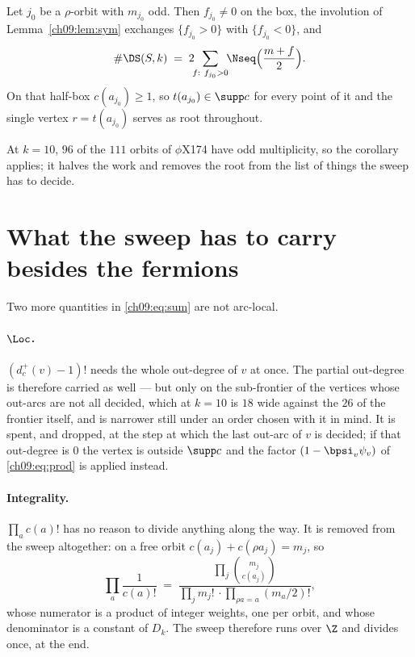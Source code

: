 \begin{corollary}\label{ch09:cor:half}
Let $j_0$ be a $\rho$-orbit with $m_{j_0}$ odd. Then $f_{j_0}\ne0$ on the box, the involution of
Lemma~\ref{ch09:lem:sym} exchanges $\{f_{j_0}>0\}$ with $\{f_{j_0}<0\}$, and
\[
\#\DS(S,k)\;=\;2\!\!\sum_{f:\ f_{j_0}>0}\!\!\Nseq\Big(\frac{m+f}{2}\Big).
\]
On that half-box $c(a_{j_0})\ge1$, so $t(a_{j_0})\in\supp c$ for every point of it and the
single vertex $r=t(a_{j_0})$ serves as root throughout.
\end{corollary}

At $k=10$, $96$ of the $111$ orbits of $\phi$X174 have odd multiplicity, so the corollary
applies; it halves the work and removes the root from the list of things the sweep has to
decide.

\section{What the sweep has to carry besides the fermions}\label{ch09:sec:carry}

Two more quantities in \eqref{ch09:eq:sum} are not arc-local.

\paragraph{\texorpdfstring{$\Loc$.}{Loc.}} $(d^+_c(v)-1)!$ needs the whole out-degree of $v$ at once. The partial
out-degree is therefore carried as well --- but only on the sub-frontier of the vertices whose
out-arcs are not all decided, which at $k=10$ is $18$ wide against the $26$ of the frontier
itself, and is narrower still under an order chosen with it in mind. It is spent, and dropped,
at the step at which the last out-arc of $v$ is decided; if that out-degree is $0$ the vertex is
outside $\supp c$ and the factor $(1-\bpsi_v\psi_v)$ of \eqref{ch09:eq:prod} is applied instead.

\paragraph{Integrality.} $\prod_ac(a)!$ has no reason to divide anything along the way. It is
removed from the sweep altogether: on a free orbit $c(a_j)+c(\rho a_j)=m_j$, so
\begin{equation}\label{ch09:eq:int}
\prod_{a}\frac1{c(a)!}\;=\;\frac{\prod_j\binom{m_j}{c(a_j)}}{\prod_j m_j!\,\cdot
\prod_{\rho a=a}(m_a/2)!},
\end{equation}
whose numerator is a product of integer weights, one per orbit, and whose denominator is a
constant of $D_k$. The sweep therefore runs over $\Z$ and divides once, at the end.


